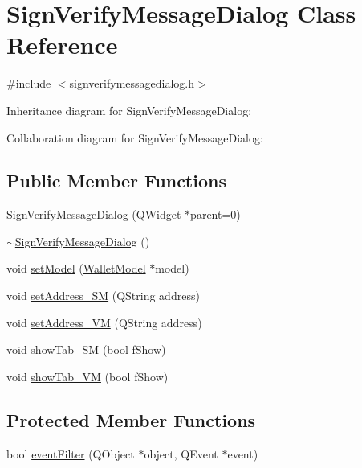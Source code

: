 \hypertarget{class_sign_verify_message_dialog}{}\section{Sign\+Verify\+Message\+Dialog Class Reference}
\label{class_sign_verify_message_dialog}


{\ttfamily \#include $<$signverifymessagedialog.\+h$>$}



Inheritance diagram for Sign\+Verify\+Message\+Dialog\+:


Collaboration diagram for Sign\+Verify\+Message\+Dialog\+:
\subsection*{Public Member Functions}
\begin{DoxyCompactItemize}
\item 
\hyperlink{class_sign_verify_message_dialog_a7f1018cc43f5c43b8d3131ac4922716b}{Sign\+Verify\+Message\+Dialog} (Q\+Widget $\ast$parent=0)
\item 
\hyperlink{class_sign_verify_message_dialog_a4b99c2759512cf2133f29cc497c5c179}{$\sim$\+Sign\+Verify\+Message\+Dialog} ()
\item 
void \hyperlink{class_sign_verify_message_dialog_ad1479ca27c2fd7d6fd1160c41660ea84}{set\+Model} (\hyperlink{class_wallet_model}{Wallet\+Model} $\ast$model)
\item 
void \hyperlink{class_sign_verify_message_dialog_ad676f0afab861bc083670316e9439c65}{set\+Address\+\_\+\+S\+M} (Q\+String address)
\item 
void \hyperlink{class_sign_verify_message_dialog_a24d7ebbcbc3f0889b64cac88788fce01}{set\+Address\+\_\+\+V\+M} (Q\+String address)
\item 
void \hyperlink{class_sign_verify_message_dialog_a3b06ea85a2640312e0074d8dabce6416}{show\+Tab\+\_\+\+S\+M} (bool f\+Show)
\item 
void \hyperlink{class_sign_verify_message_dialog_a6db3c37d3f5a3c070daed2c731cc79d5}{show\+Tab\+\_\+\+V\+M} (bool f\+Show)
\end{DoxyCompactItemize}
\subsection*{Protected Member Functions}
\begin{DoxyCompactItemize}
\item 
bool \hyperlink{class_sign_verify_message_dialog_a0e6755f1a4f2688b8e3b24a1f9b118b0}{event\+Filter} (Q\+Object $\ast$object, Q\+Event $\ast$event)
\end{DoxyCompactItemize}


